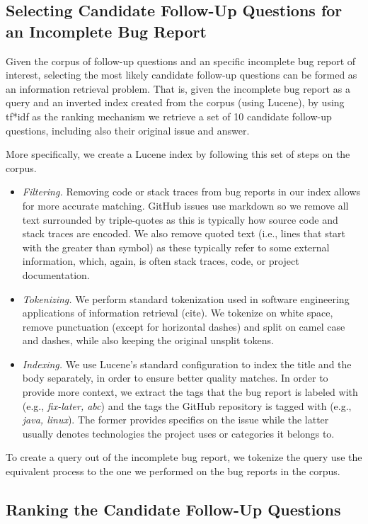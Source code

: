 \subsection{Selecting Candidate Follow-Up Questions for an Incomplete Bug Report}

Given the corpus of follow-up questions and an specific incomplete bug report of interest, selecting the
most likely candidate follow-up questions can be formed as an information retrieval
problem. That is, given the incomplete bug report as a query and an inverted index
created from the corpus (using Lucene), by using tf*idf as the ranking mechanism we
retrieve a set of 10 candidate follow-up questions, including also their original issue
and answer.

More specifically, we create a Lucene index by following this set of steps
on the corpus.
\begin{itemize}
\item {\em Filtering.} Removing code or stack traces from bug reports in our index allows
for more accurate matching. GitHub issues use markdown so we remove all text surrounded
by triple-quotes as this is typically how source code and stack traces are encoded. We also
remove quoted text (i.e., lines that start with the greater than symbol) as these typically
refer to some external information, which, again, is often stack traces, code, or project documentation.
\item {\em Tokenizing.} We perform standard tokenization used in software engineering applications
of information retrieval (cite). We tokenize on white space, remove punctuation (except for horizontal dashes)
and split on camel case and dashes, while also keeping the original unsplit tokens.
\item {\em Indexing.} We use Lucene's standard configuration to index the title and the body separately,
in order to ensure better quality matches. In order to provide more context, we extract the tags that the bug report
is labeled with (e.g., {\em fix-later, abc}) and the tags the GitHub repository is tagged with
(e.g., {\em java, linux}). The former provides specifics on the issue while the latter usually denotes
technologies the project uses or categories it belongs to.
\end{itemize}

To create a query out of the incomplete bug report, we tokenize the query use the equivalent process to
the one we performed on the bug reports in the corpus.


\subsection{Ranking the Candidate Follow-Up Questions}

